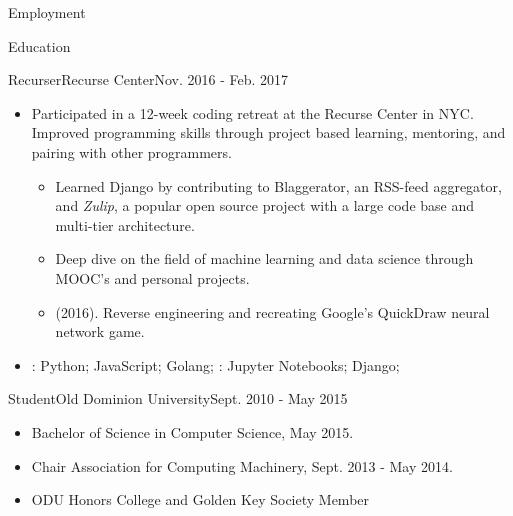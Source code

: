 \documentclass[]{mcdowellcv}
\begin{document}
\begin{cvsection}{Employment}
    \begin{cvsection}{Education}
        \begin{cvsubsection}{Recurser}{Recurse Center}{Nov. 2016 - Feb. 2017}
            \begin{itemize}
                \item Participated in a 12-week coding retreat at the Recurse Center in NYC.\newline 
                Improved programming skills through project based learning, mentoring, and pairing with other programmers.
                \begin{itemize}
                    \item Learned Django by contributing to Blaggerator, an RSS-feed aggregator, and \textit{Zulip}, a popular open source project with a large code base and multi-tier architecture.
                    \item Deep dive on the field of machine learning and data science through MOOC's and personal projects.
                    \item {} (2016). Reverse engineering and recreating Google's QuickDraw neural network game.
                \end{itemize}
            \end{itemize}
            \begin{itemize}
                 \item {}: Python; JavaScript; Golang; : Jupyter Notebooks; Django;
            \end{itemize}
        \end{cvsubsection}
        \begin{cvsubsection}{Student}{Old Dominion University}{Sept. 2010 - May 2015}
            \begin{itemize}
                \item Bachelor of Science in Computer Science, May 2015.
                \item Chair Association for Computing Machinery, Sept. 2013 - May 2014.
                \item ODU Honors College and Golden Key Society Member 
            \end{itemize}
        \end{cvsubsection}
    \end{cvsection}


\end{cvsection}
\end{document}
